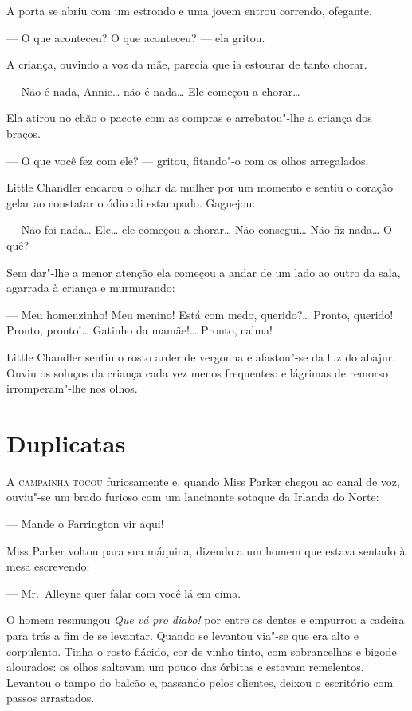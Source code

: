 A porta se abriu com um estrondo e uma jovem entrou correndo, ofegante.

--- O que aconteceu? O que aconteceu? --- ela gritou.

A criança, ouvindo a voz da mãe, parecia que ia estourar de tanto chorar.

--- Não é nada, Annie\ldots{} não é nada\ldots{} Ele começou a chorar\ldots{}

Ela atirou no chão o pacote com as compras e arrebatou"-lhe a criança dos
braços.

--- O que você fez com ele? --- gritou, fitando"-o com os olhos arregalados.

Little Chandler encarou o olhar da mulher por um momento e sentiu o coração
gelar ao constatar o ódio ali estampado.  Gaguejou:

--- Não foi nada\ldots{} Ele\ldots{} ele começou a chorar\ldots{} Não
consegui\ldots{} Não fiz nada\ldots{} O quê?

Sem dar"-lhe a menor atenção ela começou a andar de um lado ao outro da sala,
agarrada à criança e murmurando:

--- Meu homenzinho!  Meu menino!  Está com medo, querido?\ldots{} Pronto,
querido!  Pronto, pronto!\ldots{} Gatinho da mamãe!\ldots{} Pronto, calma!

Little Chandler sentiu o rosto arder de vergonha e afastou"-se da luz do abajur.
Ouviu os soluços da criança cada vez menos frequentes: e lágrimas de remorso
irromperam"-lhe nos olhos.


\chapter{Duplicatas}

\textsc{A campainha tocou} furiosamente e, quando Miss Parker chegou ao canal
de voz, ouviu"-se um brado furioso com um lancinante sotaque da Irlanda do
Norte:

--- Mande o Farrington vir aqui!

Miss Parker voltou para sua máquina, dizendo a um homem que estava sentado à
mesa escrevendo:

--- Mr.~Alleyne quer falar com você lá em cima.

O homem resmungou \textit{Que vá pro diabo!} por entre os dentes e empurrou a
cadeira para trás a fim de se levantar.  Quando se levantou via"-se que era alto
e corpulento.  Tinha o rosto flácido, cor de vinho tinto, com sobrancelhas e
bigode alourados: os olhos saltavam um pouco das órbitas e estavam remelentos.
Levantou o tampo do balcão e, passando pelos clientes, deixou o escritório com
passos arrastados.

